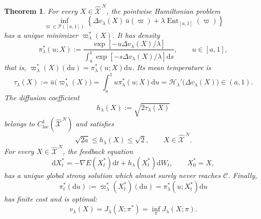 \documentclass[10pt,a4paper]{amsart}
\newtheorem{theorem}{Theorem}
\newcommand{\Coll}{\mathscr C}
\newcommand{\Ent}{\operatorname{Ent}}
\def\Xc{{\mathcal X}}
\newcommand{\dd}{\mathrm{d}}
\def\hX{\widehat{\Xc}^{\,N}}
\begin{document}
\begin{theorem}
For every $X\in\hX$, the pointwise Hamiltonian problem
\begin{equation}\label{eq:pointwise-Hamiltonian-minimization}
 \inf_{\varpi\in\mathcal P([a,1])}
 \left\{
 \Delta v_\lambda(X)\,\bar u(\varpi)
 +\lambda\Ent_{[a,1]}(\varpi)
 \right\}
\end{equation}
has a unique minimizer $\varpi_\lambda^*(X)$.  It has density
\begin{equation}\label{eq:optimal-density}
 \pi_\lambda^*(u;X)
 :=
 \frac{\exp[-u\Delta v_\lambda(X)/\lambda]}
 {\displaystyle\int_a^1\exp[-s\Delta v_\lambda(X)/\lambda]\dd s},
 \qquad u\in[a,1],
\end{equation}
that is,
$\varpi_\lambda^*(X)(\dd u)=\pi_\lambda^*(u;X)\dd u$.  Its mean temperature is
\begin{equation}\label{eq:optimal-mean-temperature}
 \tau_\lambda(X)
 :=\bar u\bigl(\varpi_\lambda^*(X)\bigr)
 =\int_a^1u\pi_\lambda^*(u;X)\dd u
 =\mathscr H_\lambda'\bigl(\Delta v_\lambda(X)\bigr)
 \in(a,1).
\end{equation}
The diffusion coefficient
\begin{equation}\label{eq:h-feedback}
 h_\lambda(X):=\sqrt{2\tau_\lambda(X)}
\end{equation}
belongs to $C^1_{\mathrm{loc}}(\hX)$ and satisfies
\[
 \sqrt{2a}\le h_\lambda(X)\le\sqrt2,
 \qquad X\in\hX.
\]
For every $X\in\hX$, the feedback equation
\begin{equation}\label{eq:optimal-feedback-SDE}
 \dd X_t^*
 =-\nabla E(X_t^*)\dd t+h_\lambda(X_t^*)\dd W_t,
 \qquad X_0^*=X,
\end{equation}
has a unique global strong solution which almost surely never reaches $\Coll$.  Finally,
\begin{equation}\label{eq:optimal-relaxed-control-process}
 \pi_t^*(\dd u)
 :=\varpi_\lambda^*(X_t^*)(\dd u)
 =\pi_\lambda^*(u;X_t^*)\dd u
\end{equation}
has finite cost and is optimal:
\begin{equation}\label{eq:verification-value}
 v_\lambda(X)=J_\lambda(X;\pi^*)=\inf_\pi J_\lambda(X;\pi).
\end{equation}
\end{theorem}
\end{document}

